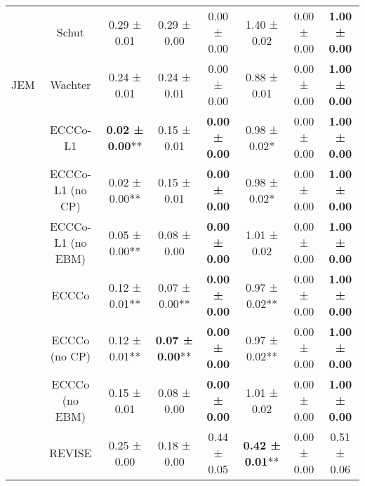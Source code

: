 \begin{table}
{\begin{tabular}[t]{cccccccc}
 & Schut & 0.29 ± 0.01\hphantom{*}\hphantom{*} & 0.29 ± 0.00\hphantom{*}\hphantom{*} & 0.00 ± 0.00\hphantom{*}\hphantom{*} & 1.40 ± 0.02\hphantom{*}\hphantom{*} & 0.00 ± 0.00\hphantom{*}\hphantom{*} & \textbf{1.00 ± 0.00}\hphantom{*}\hphantom{*}\\

\multirow[t]{-9}{*}{\centering\arraybackslash JEM} & Wachter & 0.24 ± 0.01\hphantom{*}\hphantom{*} & 0.24 ± 0.01\hphantom{*}\hphantom{*} & 0.00 ± 0.00\hphantom{*}\hphantom{*} & 0.88 ± 0.01\hphantom{*}\hphantom{*} & 0.00 ± 0.00\hphantom{*}\hphantom{*} & \textbf{1.00 ± 0.00}\hphantom{*}\hphantom{*}\\
\cmidrule{1-8}
 & ECCCo-L1 & \textbf{0.02 ± 0.00}** & 0.15 ± 0.01\hphantom{*}\hphantom{*} & \textbf{0.00 ± 0.00}\hphantom{*}\hphantom{*} & 0.98 ± 0.02*\hphantom{*} & 0.00 ± 0.00\hphantom{*}\hphantom{*} & \textbf{1.00 ± 0.00}\hphantom{*}\hphantom{*}\\

 & ECCCo-L1 (no CP) & 0.02 ± 0.00** & 0.15 ± 0.01\hphantom{*}\hphantom{*} & \textbf{0.00 ± 0.00}\hphantom{*}\hphantom{*} & 0.98 ± 0.02*\hphantom{*} & 0.00 ± 0.00\hphantom{*}\hphantom{*} & \textbf{1.00 ± 0.00}\hphantom{*}\hphantom{*}\\

 & ECCCo-L1 (no EBM) & 0.05 ± 0.00** & 0.08 ± 0.00\hphantom{*}\hphantom{*} & \textbf{0.00 ± 0.00}\hphantom{*}\hphantom{*} & 1.01 ± 0.02\hphantom{*}\hphantom{*} & 0.00 ± 0.00\hphantom{*}\hphantom{*} & \textbf{1.00 ± 0.00}\hphantom{*}\hphantom{*}\\

 & ECCCo & 0.12 ± 0.01** & 0.07 ± 0.00** & \textbf{0.00 ± 0.00}\hphantom{*}\hphantom{*} & 0.97 ± 0.02** & 0.00 ± 0.00\hphantom{*}\hphantom{*} & \textbf{1.00 ± 0.00}\hphantom{*}\hphantom{*}\\

 & ECCCo (no CP) & 0.12 ± 0.01** & \textbf{0.07 ± 0.00}** & \textbf{0.00 ± 0.00}\hphantom{*}\hphantom{*} & 0.97 ± 0.02** & 0.00 ± 0.00\hphantom{*}\hphantom{*} & \textbf{1.00 ± 0.00}\hphantom{*}\hphantom{*}\\

 & ECCCo (no EBM) & 0.15 ± 0.01\hphantom{*}\hphantom{*} & 0.08 ± 0.00\hphantom{*}\hphantom{*} & \textbf{0.00 ± 0.00}\hphantom{*}\hphantom{*} & 1.01 ± 0.02\hphantom{*}\hphantom{*} & 0.00 ± 0.00\hphantom{*}\hphantom{*} & \textbf{1.00 ± 0.00}\hphantom{*}\hphantom{*}\\

 & REVISE & 0.25 ± 0.00\hphantom{*}\hphantom{*} & 0.18 ± 0.00\hphantom{*}\hphantom{*} & 0.44 ± 0.05\hphantom{*}\hphantom{*} & \textbf{0.42 ± 0.01}** & 0.00 ± 0.00\hphantom{*}\hphantom{*} & 0.51 ± 0.06\hphantom{*}\hphantom{*}\\


\end{tabular}}
\end{table}
